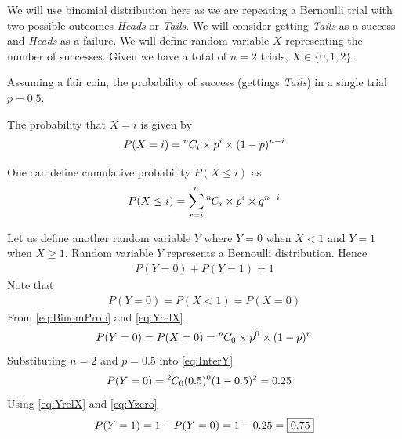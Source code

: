 \documentclass[journal,12pt,twocolumn]{IEEEtran}
\begin{document}
\solution

We will use binomial distribution here as we are repeating a Bernoulli trial with two possible outcomes \emph{Heads} or \emph{Tails}. We will consider getting \emph{Tails} as a success and \emph{Heads} as a failure. We will define random variable $X$ representing the number of successes. Given we have a total of $n = 2$ trials, $X \in \{0, 1, 2\}$.

Assuming a fair coin, the probability of success (gettings \emph{Tails}) in a single trial $p = 0.5$.

The probability that $X = i$ is  given by
\begin{align}
  P(X = i) = {{}^{n}\mkern-1muC_{i}} \times p^i \times (1-p)^{n-i}
  \label{eq:BinomProb}
\end{align}

One can define cumulative probability $P(X \leq i)$ as
\begin{align}
  P(X \leq i) = \sum_{r=i}^{n}{{}^{n}\mkern-1muC_{i}} \times p^i \times q^{n-i}
  \label{eq:CumulProb}
\end{align}

Let us define another random variable $Y$ where $Y = 0$ when $X < 1$ and $Y = 1$ when $X \geq 1$. Random variable $Y$ represents a Bernoulli distribution. Hence
\begin{align}
  P(Y = 0) + P(Y = 1) = 1
  \label{eq:BernoulliY}
\end{align}
Note that
\begin{align}
  P(Y = 0) = P(X < 1) = P(X = 0)
  \label{eq:YrelX}
\end{align}
From
\eqref{eq:BinomProb}
and
\eqref{eq:YrelX}
\begin{align}
  P(Y = 0) = P(X = 0) = {{}^{n}\mkern-1muC_{0}} \times p^0 \times (1-p)^n
  \label{eq:InterY}
\end{align}
Substituting $n = 2$ and $p = 0.5$ into
\eqref{eq:InterY}
\begin{align}
  &P(Y = 0) = {{}^{2}\mkern-1muC_{0}}(0.5)^0(1-0.5)^2 = 0.25
  \label{eq:Yzero}
\end{align}
Using
\eqref{eq:YrelX}
and
\eqref{eq:Yzero}
\begin{align}
  P(Y = 1) = 1 - P(Y = 0) = 1 - 0.25 = \fbox{0.75}
  \label{eq:Final}
\end{align}
\end{document}
